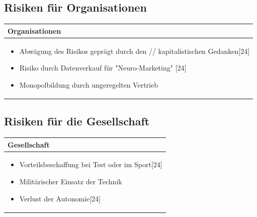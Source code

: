 \documentclass[aspectratio=169,16pt,xcolor=table]{beamer}
\begin{document}
\subsection{Risiken für Organisationen}

\begin{frame} %
\centering
\renewcommand{\arraystretch}{1.5} %
\begin{tabular}{|p{12cm}|}
    \hline
    \rowcolor{blue!25}
    \textbf{Organisationen} \\
    \hline
    \begin{itemize}
        \item Abwägung des Risikos geprägt durch den // kapitalistischen Gedanken[24]
        \item Risiko durch Datenverkauf für "Neuro-Marketing" [24]
        \item Monopolbildung durch ungeregelten Vertrieb
    \end{itemize} \\
    \hline
\end{tabular}

\end{frame}

\subsection{Risiken für die Gesellschaft}
\begin{frame} %
\centering
\renewcommand{\arraystretch}{1.5} %
\begin{tabular}{|p{12cm}|}
    \hline
    \rowcolor{blue!25}
    \textbf{Gesellschaft} \\
    \hline
    \begin{itemize}
        \item Vorteilsbeschaffung bei Test oder im Sport[24]
        \item Militärischer Einsatz der Technik
        \item Verlust der Autonomie[24]
    \end{itemize} \\
    \hline
\end{tabular}

\end{frame}



\end{document}

